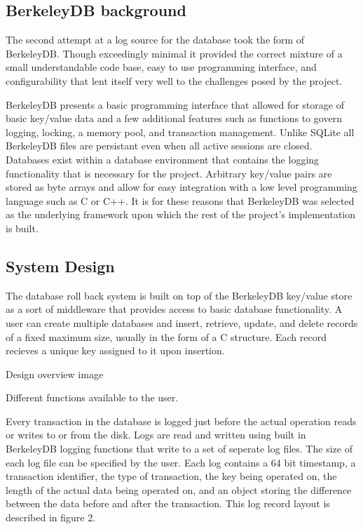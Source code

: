\documentclass{article}
\begin{document}
\subsection{BerkeleyDB background}
The second attempt at a log source for the database took the form of BerkeleyDB. Though exceedingly minimal it provided the correct mixture of a small understandable code base, easy to use programming interface, and configurability that lent itself very well to the challenges posed by the project.

BerkeleyDB presents a basic programming interface that allowed for storage of basic key/value data and a few additional features such as functions to govern logging, locking, a memory pool, and transaction management. Unlike SQLite all BerkeleyDB files are persistant even when all active sessions are closed. Databases exist within a database environment that contains the logging functionality that is necessary for the project. Arbitrary key/value pairs are stored as byte arrays and allow for easy integration with a low level programming language such as C or C++. It is for these reasons that BerkeleyDB was selected as the underlying framework upon which the rest of the project's implementation is built.

\subsection{System Design}
The database roll back system is built on top of the BerkeleyDB key/value store as a sort of middleware that provides access to basic database functionality. A user can create multiple databases and insert, retrieve, update, and delete records of a fixed maximum size, usually in the form of a C structure. Each record recieves a unique key assigned to it upon insertion. 

Design overview image

Different functions available to the user.

Every transaction in the database is logged just before the actual operation reads or writes to or from the disk. Logs are read and written using built in BerkeleyDB logging functions that write to a set of seperate log files. The size of each log file can be specified by the user. Each log contains a 64 bit timestamp, a transaction identifier, the type of transaction, the key being operated on, the length of the actual data being operated on, and an object storing the difference between the data before and after the transaction. This log record layout is described in figure 2.
\end{document}
